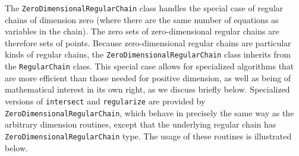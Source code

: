 The \texttt{ZeroDimensionalRegularChain} class handles the special
case of regular chains of dimension zero (where there are the same
number of equations as variables in the chain). The zero sets of
zero-dimensional regular chains are therefore sets of points. Because zero-dimensional
regular chains are particular kinds of regular chains, the \texttt{ZeroDimensionalRegularChain}
class inherits from the \texttt{RegularChain} class. This special case allows for
specialized algorithms that are more efficient than those needed for positive dimension, as
well as being of mathematical interest in its own right, as we discuss briefly below.
Specialized versions of \texttt{intersect} and
\texttt{regularize} are provided by
\texttt{ZeroDimensionalRegularChain}, which behave in precisely the same
way as the arbitrary dimension routines, except that the underlying regular
chain has \texttt{ZeroDimensionalRegularChain} type. The usage of these
routines is illustrated below.
